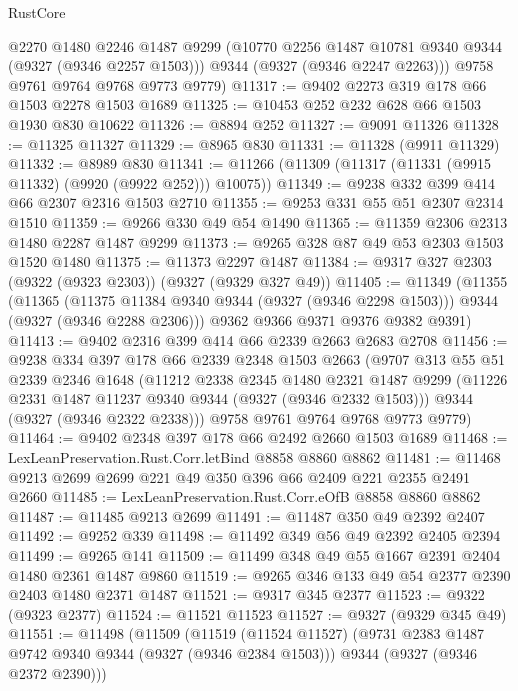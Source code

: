 \begin{lexlean}{RustCore}
\begin{coremodule}
        @2270
        @1480
        @2246
        @1487
        @9299
        (@10770 @2256 @1487 @10781 @9340 @9344 (@9327 (@9346 @2257 @1503)))
        @9344
        (@9327 (@9346 @2247 @2263)))
      @9758
      @9761
      @9764
      @9768
      @9773
      @9779)
@11317 := @9402 @2273 @319 @178 @66 @1503 @2278 @1503 @1689
@11325 := @10453 @252 @232 @628 @66 @1503 @1930 @830 @10622
@11326 := @8894 @252
@11327 := @9091 @11326
@11328 := @11325 @11327
@11329 := @8965 @830
@11331 := @11328 (@9911 @11329)
@11332 := @8989 @830
@11341 := @11266 (@11309 (@11317 (@11331 (@9915 @11332) (@9920 (@9922 @252))) @10075))
@11349 := @9238 @332 @399 @414 @66 @2307 @2316 @1503 @2710
@11355 := @9253 @331 @55 @51 @2307 @2314 @1510
@11359 := @9266 @330 @49 @54 @1490
@11365 := @11359 @2306 @2313 @1480 @2287 @1487 @9299
@11373 := @9265 @328 @87 @49 @53 @2303 @1503 @1520 @1480
@11375 := @11373 @2297 @1487
@11384 := @9317 @327 @2303 (@9322 (@9323 @2303)) (@9327 (@9329 @327 @49))
@11405 := @11349
    (@11355
      (@11365
        (@11375 @11384 @9340 @9344 (@9327 (@9346 @2298 @1503)))
        @9344
        (@9327 (@9346 @2288 @2306)))
      @9362
      @9366
      @9371
      @9376
      @9382
      @9391)
@11413 := @9402 @2316 @399 @414 @66 @2339 @2663 @2683 @2708
@11456 := @9238
    @334
    @397
    @178
    @66
    @2339
    @2348
    @1503
    @2663
    (@9707
      @313
      @55
      @51
      @2339
      @2346
      @1648
      (@11212
        @2338
        @2345
        @1480
        @2321
        @1487
        @9299
        (@11226 @2331 @1487 @11237 @9340 @9344 (@9327 (@9346 @2332 @1503)))
        @9344
        (@9327 (@9346 @2322 @2338)))
      @9758
      @9761
      @9764
      @9768
      @9773
      @9779)
@11464 := @9402 @2348 @397 @178 @66 @2492 @2660 @1503 @1689
@11468 := LexLeanPreservation.Rust.Corr.letBind @8858 @8860 @8862
@11481 := @11468 @9213 @2699 @2699 @221 @49 @350 @396 @66 @2409 @221 @2355 @2491 @2660
@11485 := LexLeanPreservation.Rust.Corr.eOfB @8858 @8860 @8862
@11487 := @11485 @9213 @2699
@11491 := @11487 @350 @49 @2392 @2407
@11492 := @9252 @339
@11498 := @11492 @349 @56 @49 @2392 @2405 @2394
@11499 := @9265 @141
@11509 := @11499 @348 @49 @55 @1667 @2391 @2404 @1480 @2361 @1487 @9860
@11519 := @9265 @346 @133 @49 @54 @2377 @2390 @2403 @1480 @2371 @1487
@11521 := @9317 @345 @2377
@11523 := @9322 (@9323 @2377)
@11524 := @11521 @11523
@11527 := @9327 (@9329 @345 @49)
@11551 := @11498
    (@11509
      (@11519
        (@11524 @11527)
        (@9731 @2383 @1487 @9742 @9340 @9344 (@9327 (@9346 @2384 @1503)))
        @9344
        (@9327 (@9346 @2372 @2390)))

\end{coremodule}
\end{lexlean}
